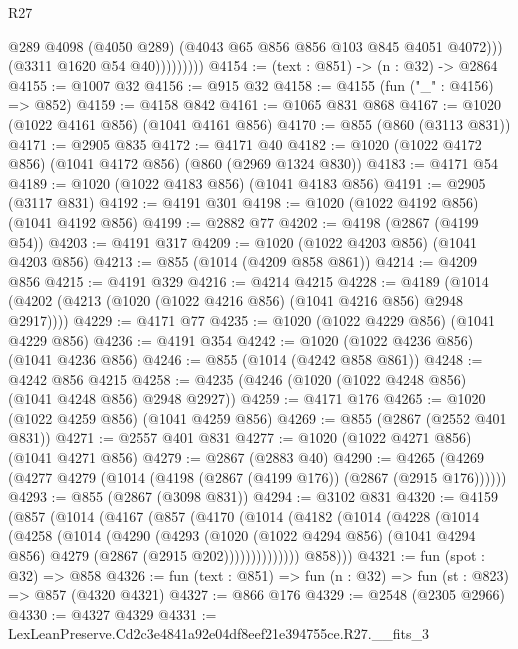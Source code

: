 \begin{lexlean}{R27}
\begin{coremodule}
                        @289
                        @4098
                        (@4050 @289)
                        (@4043 @65 @856 @856 @103 @845 @4051 @4072)))
                    (@3311 @1620 @54 @40)))))))))
@4154 := (text : @851) -> (n : @32) -> @2864
@4155 := @1007 @32
@4156 := @915 @32
@4158 := @4155 (fun ("_" : @4156) => @852)
@4159 := @4158 @842
@4161 := @1065 @831 @868
@4167 := @1020 (@1022 @4161 @856) (@1041 @4161 @856)
@4170 := @855 (@860 (@3113 @831))
@4171 := @2905 @835
@4172 := @4171 @40
@4182 := @1020 (@1022 @4172 @856) (@1041 @4172 @856) (@860 (@2969 @1324 @830))
@4183 := @4171 @54
@4189 := @1020 (@1022 @4183 @856) (@1041 @4183 @856)
@4191 := @2905 (@3117 @831)
@4192 := @4191 @301
@4198 := @1020 (@1022 @4192 @856) (@1041 @4192 @856)
@4199 := @2882 @77
@4202 := @4198 (@2867 (@4199 @54))
@4203 := @4191 @317
@4209 := @1020 (@1022 @4203 @856) (@1041 @4203 @856)
@4213 := @855 (@1014 (@4209 @858 @861))
@4214 := @4209 @856
@4215 := @4191 @329
@4216 := @4214 @4215
@4228 := @4189 (@1014 (@4202 (@4213 (@1020 (@1022 @4216 @856) (@1041 @4216 @856) @2948 @2917))))
@4229 := @4171 @77
@4235 := @1020 (@1022 @4229 @856) (@1041 @4229 @856)
@4236 := @4191 @354
@4242 := @1020 (@1022 @4236 @856) (@1041 @4236 @856)
@4246 := @855 (@1014 (@4242 @858 @861))
@4248 := @4242 @856 @4215
@4258 := @4235 (@4246 (@1020 (@1022 @4248 @856) (@1041 @4248 @856) @2948 @2927))
@4259 := @4171 @176
@4265 := @1020 (@1022 @4259 @856) (@1041 @4259 @856)
@4269 := @855 (@2867 (@2552 @401 @831))
@4271 := @2557 @401 @831
@4277 := @1020 (@1022 @4271 @856) (@1041 @4271 @856)
@4279 := @2867 (@2883 @40)
@4290 := @4265 (@4269 (@4277 @4279 (@1014 (@4198 (@2867 (@4199 @176)) (@2867 (@2915 @176))))))
@4293 := @855 (@2867 (@3098 @831))
@4294 := @3102 @831
@4320 := @4159
    (@857
      (@1014
        (@4167
          (@857
            (@4170
              (@1014
                (@4182
                  (@1014
                    (@4228
                      (@1014
                        (@4258
                          (@1014
                            (@4290
                              (@4293
                                (@1020
                                  (@1022 @4294 @856)
                                  (@1041 @4294 @856)
                                  @4279
                                  (@2867 (@2915 @202))))))))))))))
          @858)))
@4321 := fun (spot : @32) => @858
@4326 := fun (text : @851) => fun (n : @32) => fun (st : @823) => @857 (@4320 @4321)
@4327 := @866 @176
@4329 := @2548 (@2305 @2966)
@4330 := @4327 @4329
@4331 := LexLeanPreserve.Cd2c3e4841a92e04df8eef21e394755ce.R27.__fits_3

\end{coremodule}
\end{lexlean}
